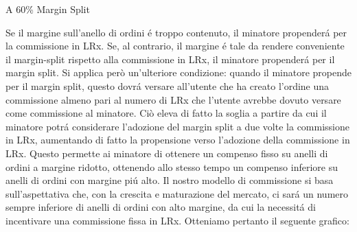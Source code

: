\documentclass[UTF8,nofonts]{article}
\makeatletter
\newenvironment{figurehere}
 {\def\@captype{figure}}
 {}
\makeatother
\begin{document}
\begin{multicols}{2}
\begin{center}
\begin{figurehere}
\caption{A 60\% Margin Split}
\label{fig:marginsplit}
\end{figurehere}
\end{center}
Se il margine sull'anello di ordini \'e troppo contenuto, il minatore propender\'a per la commissione in LRx. Se, al contrario, il margine \'e tale da rendere conveniente il margin-split rispetto alla commissione in LRx, il minatore propender\'a per il margin split. Si applica però un'ulteriore condizione: quando il minatore propende per il margin split, questo dovr\'a versare all'utente che ha creato l'ordine una commissione almeno pari al numero di LRx che l'utente avrebbe dovuto versare come commissione al minatore. Ciò eleva di fatto la soglia a partire da cui il minatore potr\'a considerare l'adozione del margin split a due volte la commissione in LRx, aumentando di fatto la propensione verso l'adozione della commissione in LRx. Questo permette ai minatore di ottenere un compenso fisso su anelli di ordini a margine ridotto, ottenendo allo stesso tempo un compenso inferiore su anelli di ordini con margine pi\'u alto.
Il nostro modello di commissione si basa sull'aspettativa che, con la crescita e maturazione del mercato, ci sar\'a un numero sempre inferiore di anelli di ordini con alto margine, da cui la necessit\'a di incentivare una commissione fissa in LRx. Otteniamo pertanto il seguente grafico:

\begin{center}
\begin{figurehere}
\centering
{}
\end{figurehere}
\end{center}
\end{multicols}
\end{document}
